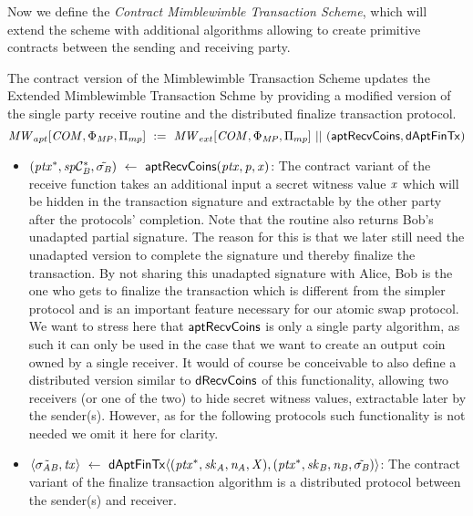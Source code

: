 Now we define the \emph{Contract Mimblewimble Transaction Scheme}, which will extend the scheme with additional algorithms allowing to create primitive contracts between the sending and receiving party.

\begin{definition}
    \label{def:atom:apt-ext-mw-tx-scheme}
    The contract version of the Mimblewimble Transaction Scheme updates the Extended Mimblewimble Transaction Schme by providing a modified version of the single party receive routine and the distributed finalize transaction protocol.
    \[ \mathit{MW}_{apt}[\mathit{COM},\Phi_{\mathit{MP}},\Pi_{mp}] ~:=~ \mathit{MW}_{ext}[\mathit{COM},\Phi_{\mathit{MP}},\Pi_{mp}] ~||~ (\mathsf{aptRecvCoins}, \mathsf{dAptFinTx}) \]
    \begin{itemize}
        \item $(\mathit{ptx}^*, \mathit{sp}\mathcal{C}_{\mathit{B}}^*, \tilde{\sigma_{\mathit{B}}}) ~\leftarrow~ \mathsf{aptRecvCoins}(\mathit{ptx},\mathit{p},\mathit{x})$: The contract variant of the receive function takes an additional input a secret witness value
        $\mathit{x}$ which will be hidden in the transaction signature and extractable by the other party after the protocols' completion.
        Note that the routine also returns Bob's unadapted partial signature.
        The reason for this is that we later still need the unadapted version to complete the signature und thereby finalize the transaction.
        By not sharing this unadapted signature with Alice, Bob is the one who gets to finalize the transaction which is different from the simpler protocol and is an important feature necessary for our atomic swap protocol.
        We want to stress here that $\mathsf{aptRecvCoins}$ is only a single party algorithm, as such it can only be used in the case that we want to create an output coin owned by a single receiver.
        It would of course be conceivable to also define a distributed version similar to $\mathsf{dRecvCoins}$ of this functionality, allowing two receivers (or one of the two) to hide secret witness values, extractable later by the sender(s).
        However, as for the following protocols such functionality is not needed we omit it here for clarity.
        \item $\langle \tilde{\sigma_{\mathit{A}\mathit{B}}}, \mathit{tx} \rangle ~\leftarrow~ \mathsf{dAptFinTx} \langle (\mathit{ptx}^*,\mathit{sk}_{\mathit{A}},\mathit{\mathit{n}_{\mathit{A}}},\mathit{X}), (\mathit{ptx}^*,\mathit{sk}_{\mathit{B}},\mathit{\mathit{n}_{\mathit{B}}},\tilde{\sigma_{\mathit{B}}}) \rangle$: The contract variant of the finalize transaction algorithm is a distributed protocol between the sender(s) and receiver.

\end{itemize}
\end{definition}
